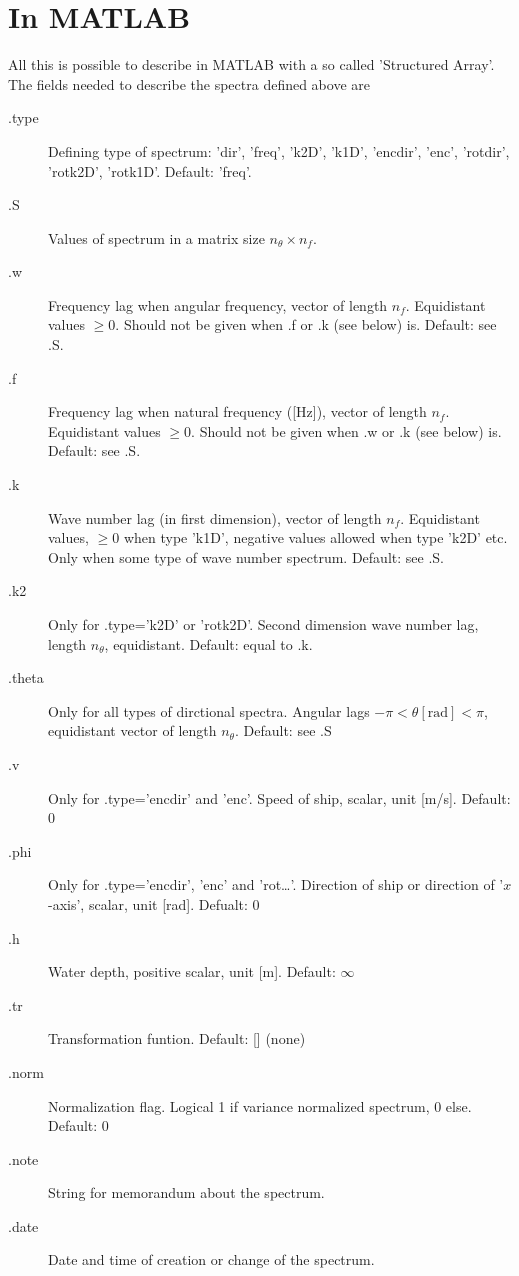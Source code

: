 \documentclass{article}
\begin{document}
\section{In MATLAB}
All this is possible to describe in MATLAB with a so called 'Structured 
Array'. The fields needed to describe the spectra defined above are
\begin{description}
\item[.type] Defining type of spectrum: 'dir', 'freq', 'k2D', 'k1D',
  'encdir', 'enc', 'rotdir', 'rotk2D', 'rotk1D'. Default: 'freq'.\\
\item[.S] Values of spectrum in a matrix size $n_{\theta} \times
  n_f$. 
\item[.w] Frequency lag when angular frequency, vector of length
  $n_f$.  Equidistant values $\geq 0$. Should not be given when .f or .k (see
  below) is. Default: see .S.\\
\item[.f] Frequency lag when natural frequency ([Hz]), vector of length
  $n_f$. Equidistant values $\geq 0$. Should not be given when .w or .k (see
  below) is. Default: see .S.\\
\item[.k] Wave number lag (in first dimension), vector of length
  $n_f$.  Equidistant values, $\geq 0$ when type 'k1D', negative
  values allowed when type 'k2D' etc. Only when some type of wave number
  spectrum. Default: see .S.\\
\item[.k2] Only for .type='k2D' or 'rotk2D'. Second dimension wave number
  lag, length $n_{\theta}$, equidistant. Default: equal to .k.\\
\item[.theta] Only for all types of dirctional spectra. Angular lags
  $-{\pi}<{\theta}[\text{rad}]<{\pi}$,
   equidistant vector of length $n_{\theta}$.  Default: see .S\\
\item[.v] Only for .type='encdir' and 'enc'. Speed of ship, scalar,
  unit [m/s]. Default: 0\\
\item[.phi] Only for .type='encdir', 'enc' and 'rot\ldots'. Direction of ship 
  or direction of '$x$-axis', scalar, unit [rad]. Defualt: 0\\
\item[.h] Water depth, positive scalar, unit [m]. Default: $\infty$\\
\item[.tr] Transformation funtion. Default: [] (none)
\item[.norm] Normalization flag. Logical 1 if variance normalized
  spectrum, 0 else. Default: 0
\item[.note] String for memorandum about the spectrum.
\item[.date] Date and time of creation or change of the spectrum.
\end{description}
\end{document}

